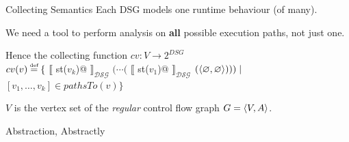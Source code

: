 \documentclass[xcolor={usenames,dvipsnames}]{beamer}
\makeatletter
\newcommand\defeq{\stackrel{\mathclap{\tiny\mbox{def}}}{=}}
\newcommand{\transformer}[2]{$\llbracket$ \lstinline@#1@
  $\rrbracket_{\mathcal{#2}}$}
\newcommand{\transformerDSG}[1]{\transformer{#1}{DSG}}
\makeatother
\begin{document}
\begin{frame}[fragile]{Collecting Semantics}
  Each DSG models one runtime behaviour (of many).

  \vspace{1em}

  We need a tool to perform analysis on \textbf{all} possible execution paths, not just one.

  \vspace{2em}

  Hence the collecting function $cv: V \to 2^{DSG}$ \\
  $cv(v) \defeq \{ $ \transformerDSG{st($v_k$)} $ ( \cdots ( $ \transformerDSG{st($v_1$)} $ ( \langle \varnothing, \varnothing \rangle ))) \mid $ \\
  \hspace{16em} $ \left[ v_1, \ldots, v_k \right] \in pathsTo(v) \} $

  \vspace{2em}

  $V$ is the vertex set of the \textit{regular} control flow graph $G = \langle V, A \rangle$.
\end{frame}


\begin{frame}{Abstraction, Abstractly}
  \vspace{-0.5em}
  \begin{center}
  \end{center}
\end{frame}
\end{document}
